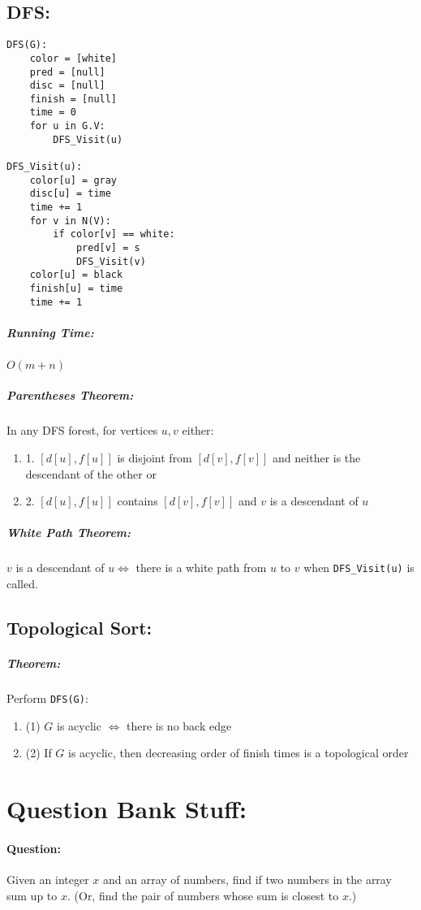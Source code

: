 \documentclass{article}
\newcommand{\code}[1]{\texttt{#1}}
\begin{document}
\subsection{DFS:}
\begin{lstlisting}
DFS(G):
    color = [white]
    pred = [null]
    disc = [null]
    finish = [null]
    time = 0
    for u in G.V:
        DFS_Visit(u)

DFS_Visit(u):
    color[u] = gray
    disc[u] = time
    time += 1
    for v in N(V):
        if color[v] == white:
            pred[v] = s
            DFS_Visit(v)
    color[u] = black
    finish[u] = time
    time += 1
\end{lstlisting}

\subparagraph{Running Time:} \(O(m + n)\)

\subparagraph{Parentheses Theorem:} In any DFS forest, for vertices \(u, v\) either:
\begin{enumerate}
    \item[] 1. \([d[u],f[u]]\) is disjoint from \([d[v],f[v]]\) and neither is the descendant of the other or
    \item[] 2. \([d[u],f[u]]\) contains \([d[v],f[v]]\) and \(v\) is a descendant of \(u\)
\end{enumerate}

\subparagraph{White Path Theorem:} \(v\) is a descendant of \(u \iff\) there is a white path from \(u\) to \(v\) when \code{DFS\_Visit(u)} is called.

\subsection{Topological Sort:}
\subparagraph{Theorem:} Perform \code{DFS(G)}:
\begin{enumerate}
    \item[] (1) \(G\) is acyclic \(\iff\) there is no back edge
    \item[] (2) If \(G\) is acyclic, then decreasing order of finish times is a topological order
\end{enumerate}

\section{Question Bank Stuff:}

\paragraph{Question:} Given an integer \(x\) and an array of numbers, find if two numbers in the array sum up to \(x\). (Or, find the pair of numbers whose sum is closest to \(x\).)
\end{document}
